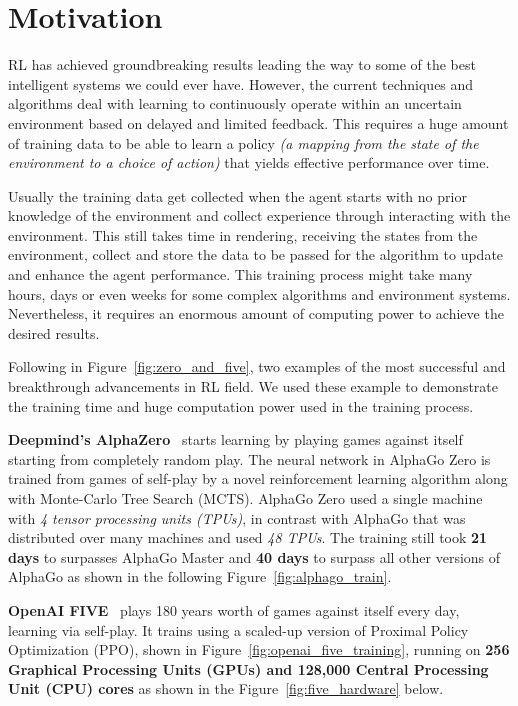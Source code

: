 \section{Motivation}

RL has achieved groundbreaking results leading the way to some of the best intelligent systems we could ever have. However, the current techniques and algorithms deal with learning to continuously operate within an uncertain environment based on delayed and limited feedback. This requires a huge amount of training data to be able to learn a policy \textit{(a mapping from the state of the environment to a choice of action)} that yields effective performance over time.

Usually the training data get collected when the agent starts with no prior knowledge of the environment and collect experience through interacting with the environment. This still takes time in rendering, receiving the states from the environment, collect and store the data to be passed for the algorithm to update and enhance the agent performance. This training process might take many hours, days or even weeks for some complex algorithms and environment systems. Nevertheless, it requires an enormous amount of computing power to achieve the desired results. 

Following in Figure~\ref{fig:zero_and_five}, two examples of the most successful and breakthrough advancements in RL field. We used these example to demonstrate the training time and huge computation power used in the training process.

\textbf{Deepmind's AlphaZero}~\parencite{silver2017mastering} starts learning by playing games against itself starting from completely random play. The neural network in AlphaGo Zero is trained from games of self-play by a novel reinforcement learning algorithm along with Monte-Carlo Tree Search (MCTS). AlphaGo Zero used a single machine with \textit{4 tensor processing units (TPUs)}, in contrast with AlphaGo that was distributed over many machines and used \textit{48 TPUs}. The training still took \textbf{21 days} to surpasses AlphaGo Master and \textbf{40 days} to surpass all other versions of AlphaGo as shown in the following Figure~\ref{fig:alphago_train}.

\textbf{OpenAI FIVE}~\parencite{OpenAI_dota} plays 180 years worth of games against itself every day, learning via self-play. It trains using a scaled-up version of Proximal Policy Optimization (PPO), shown in Figure~\ref{fig:openai_five_training}, running on \textbf{256 Graphical Processing Units (GPUs) and 128,000 Central Processing Unit (CPU) cores} as shown in the Figure~\ref{fig:five_hardware} below.

